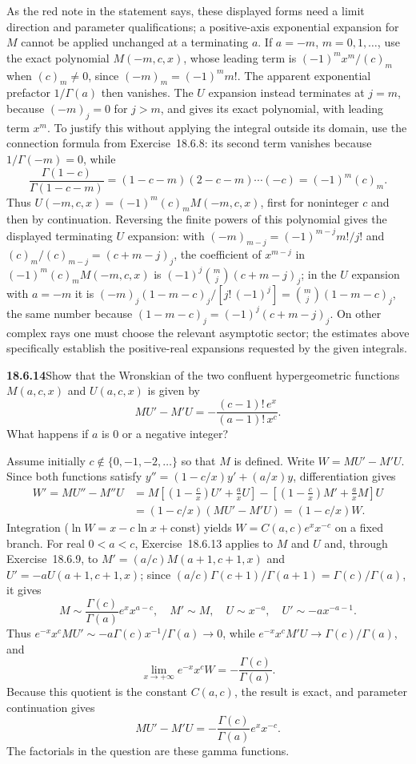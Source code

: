 As the red note in the statement says, these displayed forms need
a limit direction and parameter qualifications; a positive-axis
exponential expansion for $M$ cannot be applied unchanged at a
terminating $a$.
If $a=-m$, $m=0,1,\ldots$, use the exact polynomial
$M(-m,c,x)$, whose leading term is $(-1)^mx^m/(c)_m$
when $(c)_m\ne0$, since $(-m)_m=(-1)^mm!$.  The apparent
exponential prefactor $1/\Gamma(a)$ then vanishes.  The $U$
expansion instead terminates at $j=m$, because $(-m)_j=0$ for
$j>m$, and gives its exact polynomial, with leading
term $x^m$.  To justify this without applying the integral outside
its domain, use the connection formula from Exercise~18.6.8:
its second term vanishes because $1/\Gamma(-m)=0$, while
\[
\frac{\Gamma(1-c)}{\Gamma(1-c-m)}=(1-c-m)(2-c-m)\cdots(-c)
=(-1)^m(c)_m.
\]
Thus $U(-m,c,x)=(-1)^m(c)_mM(-m,c,x)$, first for noninteger
$c$ and then by continuation.  Reversing the finite powers of this
polynomial gives the displayed terminating $U$ expansion: with
$(-m)_{m-j}=(-1)^{m-j}m!/j!$ and $(c)_m/(c)_{m-j}=(c+m-j)_j$, the
coefficient of $x^{m-j}$ in $(-1)^m(c)_mM(-m,c,x)$ is
$(-1)^j\binom mj(c+m-j)_j$; in the $U$ expansion with $a=-m$ it is
$(-m)_j(1-m-c)_j/[j!\,(-1)^j]=\binom mj(1-m-c)_j$, the same number
because $(1-m-c)_j=(-1)^j(c+m-j)_j$.
On other complex rays one must choose the relevant
asymptotic sector; the estimates above specifically establish the
positive-real expansions requested by the given integrals.

\par\bigskip
\noindent\textbf{18.6.14}\quad Show that the Wronskian of the two
confluent hypergeometric functions $M(a,c,x)$ and $U(a,c,x)$ is
given by
\[
MU'-M'U=-\frac{(c-1)!\,e^{x}}{(a-1)!\,x^{c}}.
\]
What happens if $a$ is $0$ or a negative integer?
\par\nobreak
\solution
Assume initially $c\notin\{0,-1,-2,\ldots\}$ so that $M$
is defined.  Write $W=MU'-M'U$.  Since both functions satisfy
$y''=(1-c/x)y'+(a/x)y$, differentiation gives
\begin{align*}
W'=MU''-M''U
&=M[(1-\tfrac cx)U'+\tfrac axU]-[(1-\tfrac cx)M'+\tfrac axM]U\\
&=(1-c/x)(MU'-M'U)=(1-c/x)W.
\end{align*}
Integration ($\ln W=x-c\ln x+{}$const) yields $W=C(a,c)e^xx^{-c}$
on a fixed branch.
For real $0<a<c$, Exercise~18.6.13 applies to $M$ and $U$ and,
through Exercise~18.6.9, to $M'=(a/c)M(a+1,c+1,x)$ and
$U'=-aU(a+1,c+1,x)$; since
$(a/c)\Gamma(c+1)/\Gamma(a+1)=\Gamma(c)/\Gamma(a)$, it gives
\[
M\sim\frac{\Gamma(c)}{\Gamma(a)}e^xx^{a-c},\quad
M'\sim M,\quad U\sim x^{-a},\quad U'\sim-ax^{-a-1}.
\]
Thus $e^{-x}x^cMU'\sim-a\Gamma(c)x^{-1}/\Gamma(a)\to0$,
while $e^{-x}x^cM'U\to\Gamma(c)/\Gamma(a)$, and
\[
\lim_{x\to+\infty}e^{-x}x^cW
 =-\frac{\Gamma(c)}{\Gamma(a)}.
\]
Because this quotient is the constant $C(a,c)$, the result is
exact, and parameter continuation gives
\[
\boxed{MU'-M'U=-\frac{\Gamma(c)}{\Gamma(a)}e^xx^{-c}}.
\]
The factorials in the question are these gamma functions.


